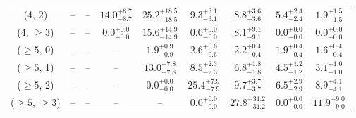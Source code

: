 \begin{table}[h!]
{\begin{tabular}{ccccccccc}
	(4, 2) & -- & -- & $14.0^{+ 8.7 }_{- 8.7 }$ & $25.2^{+ 18.5 }_{- 18.5 }$ & $9.3^{+ 3.1 }_{- 3.1 }$ & $8.8^{+ 3.6 }_{- 3.6 }$ & $5.4^{+ 2.4 }_{- 2.4 }$ & $1.9^{+ 1.5 }_{- 1.5 }$ \\[0.5ex] 
	(4, $\ge3$) & -- & -- & $0.0^{+ 0.0 }_{- 0.0 }$ & $15.6^{+ 14.9 }_{- 14.9 }$ & $0.0^{+ 0.0 }_{- 0.0 }$ & $8.1^{+ 9.1 }_{- 9.1 }$ & $0.0^{+ 0.0 }_{- 0.0 }$ & $0.0^{+ 0.0 }_{- 0.0 }$ \\[0.5ex] 
	($\ge5$, 0) & -- & -- & -- & $1.9^{+ 0.9 }_{- 0.9 }$ & $2.6^{+ 0.6 }_{- 0.6 }$ & $2.2^{+ 0.4 }_{- 0.4 }$ & $1.9^{+ 0.4 }_{- 0.4 }$ & $1.6^{+ 0.4 }_{- 0.4 }$ \\[0.5ex] 
	($\ge5$, 1) & -- & -- & -- & $13.0^{+ 7.8 }_{- 7.8 }$ & $8.5^{+ 2.3 }_{- 2.3 }$ & $6.8^{+ 1.8 }_{- 1.8 }$ & $4.5^{+ 1.2 }_{- 1.2 }$ & $3.1^{+ 1.0 }_{- 1.0 }$ \\[0.5ex] 
	($\ge5$, 2) & -- & -- & -- & $0.0^{+ 0.0 }_{- 0.0 }$ & $25.4^{+ 7.9 }_{- 7.9 }$ & $9.7^{+ 3.7 }_{- 3.7 }$ & $6.5^{+ 2.9 }_{- 2.9 }$ & $8.9^{+ 4.1 }_{- 4.1 }$ \\[0.5ex] 
	($\ge5$, $\ge3$) & -- & -- & -- & -- & $0.0^{+ 0.0 }_{- 0.0 }$ & $27.8^{+ 31.2 }_{- 31.2 }$ & $0.0^{+ 0.0 }_{- 0.0 }$ & $11.9^{+ 9.0 }_{- 9.0 }$ \\[0.5ex] 
	\hline
	\hline
\end{tabular}}
\end{table}
